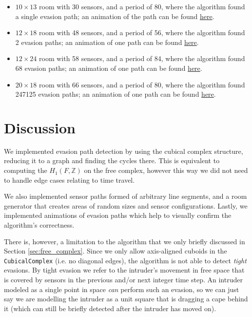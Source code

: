 \documentclass{article}
\begin{document}
\begin{itemize}
  \item $10 \times 13$ room with 30 sensors, and a period of 80, where the algorithm found a single evasion path; an animation of the path can be found \href{https://github.com/MOj0/TDA_Evasion/blob/main/gifs/random_sensor_network_10x13_s30_p80_e1.gif}{here}.
  \item $12 \times 18$ room with 48 sensors, and a period of 56, where the algorithm found 2 evasion paths; an animation of one path can be found \href{https://github.com/MOj0/TDA_Evasion/blob/main/gifs/random_sensor_network_12x18_s48_p56_e2.gif}{here}.
  \item $12 \times 24$ room with 58 sensors, and a period of 84, where the algorithm found 68 evasion paths; an animation of one path can be found \href{https://github.com/MOj0/TDA_Evasion/blob/main/gifs/random_sensor_network_12x24_s58_p84_e68.gif}{here}.
  \item $20 \times 18$ room with 66 sensors, and a period of 80, where the algorithm found 247125 evasion paths; an animation of one path can be found \href{https://github.com/MOj0/TDA_Evasion/blob/main/gifs/random_sensor_network_20x18_s66_p80_e247125.gif}{here}.
\end{itemize}


\section{Discussion}

We implemented evasion path detection by using the cubical complex structure, reducing it to a graph and finding the cycles there.
This is equivalent to computing the $ H_1(F, \mathbb{Z})$ on the free complex, however this way we did not need to handle edge cases relating to time travel.

We also implemented sensor paths formed of arbitrary line segments, and a room generator that creates areas of random sizes and sensor configurations.
Lastly, we implemented animations of evasion paths which help to visually confirm the algorithm's correctness.

There is, however, a limitation to the algorithm that we only briefly discussed in Section \ref{sec:free_complex}.
Since we only allow axis-aligned cuboids in the \texttt{CubicalComplex} (i.e. no diagonal edges), the algorithm is not able to detect \textit{tight} evasions.
By tight evasion we refer to the intruder's movement in free space that is covered by sensors in the previous and/or next integer time step. An intruder modeled as a single point in space {\it can} perform such an evasion, so we can just say we are modelling the intruder as a unit square that is dragging a cape behind it (which can still be briefly detected after the intruder has moved on).
\end{document}
